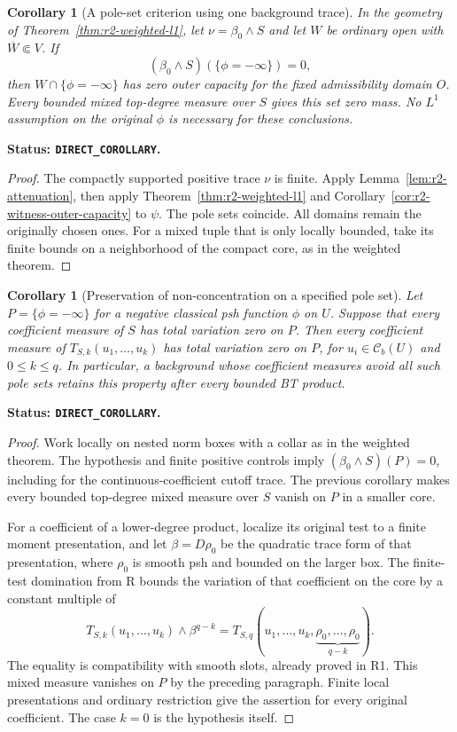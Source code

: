 \documentclass[11pt,a4paper]{article}
\numberwithin{equation}{section}
\newtheorem{corollary}[theorem]{Corollary}
\theoremstyle{definition}
\theoremstyle{remark}
\newcommand{\Cb}{\mathcal C_b}
\begin{document}
\begin{corollary}[A pole-set criterion using one background trace]
\label{cor:r2-no-pole-trace}
In the geometry of Theorem~\ref{thm:r2-weighted-l1}, let
$\nu=\beta_0\wedge S$ and let $W$ be ordinary open with
$\overline W\Subset V$. If
\[
 (\beta_0\wedge S)(\{\phi=-\infty\})=0,
\]
then $W\cap\{\phi=-\infty\}$ has zero outer capacity for the
fixed admissibility domain $O$. Every bounded mixed top-degree
measure over $S$ gives this set zero mass. No $L^1$ assumption on
the original $\phi$ is necessary for these conclusions.
\end{corollary}

\noindent\textbf{Status: \texttt{DIRECT\_COROLLARY}.}

\begin{proof}
The compactly supported positive trace $\nu$ is finite. Apply
Lemma~\ref{lem:r2-attenuation}, then apply
Theorem~\ref{thm:r2-weighted-l1} and
Corollary~\ref{cor:r2-witness-outer-capacity} to $\psi$.
The pole sets coincide. All domains remain the originally chosen
ones. For a mixed tuple that is only locally bounded, take its
finite bounds on a neighborhood of the compact core, as in the
weighted theorem.
\end{proof}

\begin{corollary}[Preservation of non-concentration on a specified pole set]
\label{cor:r2-background-pole-preservation}
Let $P=\{\phi=-\infty\}$ for a negative classical psh function
$\phi$ on $U$. Suppose that every coefficient measure of $S$
has total variation zero on $P$. Then every coefficient measure
of $T_{S,k}(u_1,\ldots,u_k)$ has total variation zero on $P$,
for $u_i\in\Cb(U)$ and $0\leq k\leq q$.
In particular, a background whose coefficient measures avoid all
such pole sets retains this property after every bounded BT product.
\end{corollary}

\noindent\textbf{Status: \texttt{DIRECT\_COROLLARY}.}

\begin{proof}
Work locally on nested norm boxes with a collar as in the weighted
theorem. The hypothesis and finite positive controls imply
$(\beta_0\wedge S)(P)=0$, including for the continuous-coefficient
cutoff trace. The previous corollary makes every bounded top-degree
mixed measure over $S$ vanish on $P$ in a smaller core.

For a coefficient of a lower-degree product, localize its original
test to a finite moment presentation, and let
$\beta=D\rho_0$ be the quadratic trace form of that presentation,
where $\rho_0$ is smooth psh and bounded on the larger box.
The finite-test domination from R bounds the variation of that
coefficient on the core by a constant multiple of
\[
 T_{S,k}(u_1,\ldots,u_k)\wedge\beta^{q-k}
   =T_{S,q}(u_1,\ldots,u_k,
                 \underbrace{\rho_0,\ldots,\rho_0}_{q-k}).
\]
The equality is compatibility with smooth slots, already proved in
R1. This mixed measure vanishes on $P$ by the preceding paragraph.
Finite local presentations and ordinary restriction give the
assertion for every original coefficient. The case $k=0$ is the
hypothesis itself.
\end{proof}
\end{document}

